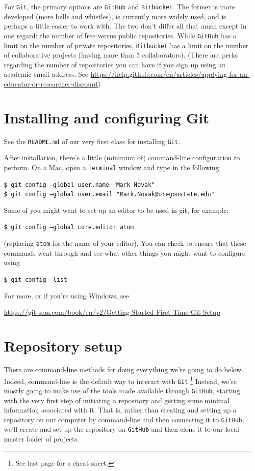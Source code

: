 \documentclass[12pt,letterpaper]{article}
\begin{document}
For \texttt{Git}, the primary options are \texttt{GitHub} and 
\texttt{Bitbucket}.
The former is more developed (more bells and whistles), is currently more widely used, and is perhaps a little easier to work with.
The two don't differ all that much except in one regard:  the number of free versus public repositories.
While \texttt{GitHub} has a limit on the number of private repositories, 
\texttt{Bitbucket} has a limit on the number of collaborative projects (having 
more than 5 collaborators).
(There are perks regarding the number of repositories you can have if you sign up using an academic email address.  See \url{https://help.github.com/en/articles/applying-for-an-educator-or-researcher-discount})



\section{Installing and configuring Git}
See the \texttt{README.md} of our very first class for installing \texttt{Git}.

After installation, there's a little (minimum of) command-line configuration to perform.
On a Mac, open a \texttt{Terminal} window and type in the following:

\noindent
     \texttt{\$ git config --global user.name "Mark Novak"}\\
     \texttt{\$ git config --global user.email "Mark.Novak@oregonstate.edu"}

\noindent
Some of you might want to set up an editor to be used in git, for example:

\noindent
	\texttt{\$ git config --global core.editor atom}

\noindent
(replacing \texttt{atom} for the name of your editor).
You can check to ensure that these commands went through and see what other things you might want to configure using

\noindent
\texttt{\$ git config --list}

\noindent
For more, or if you're using Windows, see\\
\begin{footnotesize}
\url{https://git-scm.com/book/en/v2/Getting-Started-First-Time-Git-Setup}
\end{footnotesize}




\section{Repository setup}
There are command-line methods for doing everything we're going to do below.
Indeed, command-line is the default way to interact with \texttt{Git}.\footnote{See last page for a cheat sheet.}
Instead, we're mostly going to make use of the tools made available through 
\texttt{GitHub}, starting with the very first step of initiating a repository and 
getting some minimal information associated with it.
That is, rather than creating and setting up a repository on our computer by 
command-line and then connecting it to \texttt{GitHub}, we'll create and set up 
the repository on \texttt{GitHub} and then clone it to our local master folder of 
projects.
\end{document}
